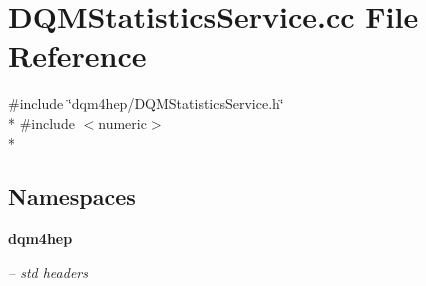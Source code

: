 \section{D\+Q\+M\+Statistics\+Service.\+cc File Reference}
\label{DQMStatisticsService_8cc}
{\ttfamily \#include \char`\"{}dqm4hep/\+D\+Q\+M\+Statistics\+Service.\+h\char`\"{}}\\*
{\ttfamily \#include $<$numeric$>$}\\*
\subsection*{Namespaces}
\begin{DoxyCompactItemize}
\item 
 {\bf dqm4hep}
\begin{DoxyCompactList}\small\item\em -- std headers \end{DoxyCompactList}\end{DoxyCompactItemize}
